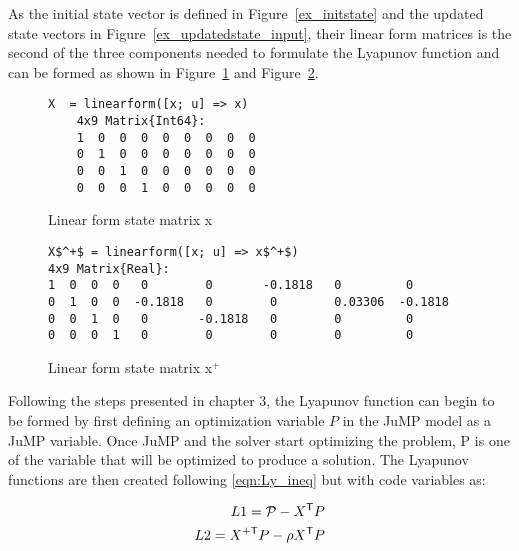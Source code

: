 As the initial state vector is defined in Figure~\ref{ex_initstate} and the updated state vectors in Figure~\ref{ex_updatedstate_input}, their linear form matrices is the second of the three components needed to formulate the Lyapunov function and can be formed as shown in Figure~\ref{ex_linearform_state} and Figure~\ref{ex_linearform_next_state}.

\begin{figure}[h!]
    \begin{lstlisting}[mathescape]
X  = linearform([x; u] => x)
    4x9 Matrix{Int64}:
    1  0  0  0  0  0  0  0  0
    0  1  0  0  0  0  0  0  0
    0  0  1  0  0  0  0  0  0
    0  0  0  1  0  0  0  0  0    
    \end{lstlisting}
    \caption{Linear form state matrix x}
    \label{ex_linearform_state}
\end{figure}
\begin{figure}[h!]
    \begin{lstlisting}[mathescape]
X$^+$ = linearform([x; u] => x$^+$)
4x9 Matrix{Real}:
1  0  0  0   0        0       -0.1818   0         0
0  1  0  0  -0.1818   0        0        0.03306  -0.1818
0  0  1  0   0       -0.1818   0        0         0
0  0  0  1   0        0        0        0         0
\end{lstlisting}
\caption{Linear form state matrix x$^+$}
\label{ex_linearform_next_state}
\end{figure}
Following the steps presented in chapter 3, the Lyapunov function can begin to be formed by first defining an optimization variable $P$ in the JuMP model as a JuMP variable. Once JuMP and the solver start optimizing the problem, P is one of the variable that will be optimized to produce a solution. The Lyapunov functions are then created following \eqref{eqn:Ly_ineq} but with code variables as:

\begin{subequations} \label{eqn:Ly_ineq3}
	\begin{align}
	    L1 = \mathcal{P} - X^{\mathsf{T}} P     \\
        L2 = X^{+\mathsf{T}} P - \rho X^{\mathsf{T}} P
	\end{align}
\end{subequations}

